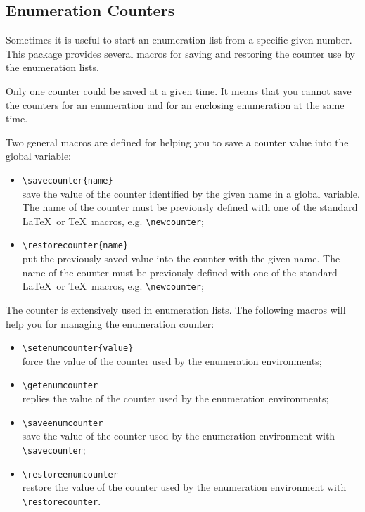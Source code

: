 \documentclass[book]{upmethodology-document}
\begin{document}
\subsection{Enumeration Counters}

Sometimes it is useful to start an enumeration list from a specific given number. This package provides several macros for saving and restoring the counter use by the enumeration lists.

\begin{upmcaution}
Only one counter could be saved at a given time.
It means that you cannot save the counters for an enumeration and for an enclosing enumeration at the same time.
\end{upmcaution}

Two general macros are defined for helping you to save a counter value into the global variable: 
\begin{itemize}
\item \texttt{{\textbackslash}savecounter\{name\}} \\
	save the value of the counter identified by the given name in a global variable.
	The name of the counter must be previously defined with one of the standard \LaTeX\ or \TeX\ macros, e.g. \texttt{{\textbackslash}newcounter};
\item \texttt{{\textbackslash}restorecounter\{name\}} \\
	put the previously saved value into the counter with the given name.
	The name of the counter must be previously defined with one of the standard \LaTeX\ or \TeX\ macros, e.g. \texttt{{\textbackslash}newcounter};
\end{itemize}

The counter is extensively used in enumeration lists. The following macros will help you for managing the enumeration counter:
\begin{itemize}
\item \texttt{{\textbackslash}setenumcounter\{value\}} \\
	force the value of the counter used by the enumeration environments;
\item \texttt{{\textbackslash}getenumcounter} \\
	replies the value of the counter used by the enumeration environments;
\item \texttt{{\textbackslash}saveenumcounter} \\
	save the value of the counter used by the enumeration environment with \texttt{{\textbackslash}savecounter};
\item \texttt{{\textbackslash}restoreenumcounter} \\
	restore the value of the counter used by the enumeration environment with \texttt{{\textbackslash}restorecounter}.
\end{itemize}
\end{document}
